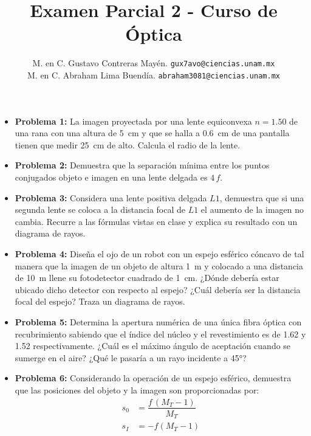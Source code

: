 \documentclass[14pt]{extarticle}
\author{\normalsize{M. en C. Gustavo Contreras Mayén.} \quad \normalsize{\texttt{gux7avo@ciencias.unam.mx}} \\
\normalsize{M. en C. Abraham Lima Buendía.} \quad \normalsize{\texttt{abraham3081@ciencias.unam.mx}}}
\title{\vspace*{-2cm} Examen Parcial 2 - Curso de Óptica}
\date{ }
\begin{document}
\maketitle
\fontsize{14}{14}\selectfont


\begin{itemize}
\item \textbf{Problema 1:} La imagen proyectada por una lente equiconvexa $n = 1.50$ de una rana con una  altura de \SI{5}{\centi\meter} y que se halla a \SI{0.6}{\centi\meter} de una pantalla tienen que medir \SI{25}{\centi\meter} de alto. Calcula el radio de la lente.
\item \textbf{Problema 2:} Demuestra que la separación mínima entre los puntos conjugados objeto e imagen en una lente delgada es $4 \, f$.
\item \textbf{Problema 3:} Considera una lente positiva delgada $L1$, demuestra que si una segunda lente se coloca a la distancia focal de $L1$ el aumento de la imagen no cambia. Recurre a las fórmulas vistas en clase y explica su resultado con un diagrama de rayos.
\item \textbf{Problema 4:} Diseña el ojo de un robot con un espejo esférico cóncavo de tal manera que la imagen de un objeto de altura \SI{1}{\meter} y colocado a una distancia de \SI{10}{\meter} llene su fotodetector cuadrado de \SI{1}{\centi\meter}. ¿Dónde debería estar ubicado dicho detector con respecto al espejo? ¿Cuál debería ser la distancia focal del espejo? Traza un diagrama de rayos.
\item \textbf{Problema 5:} Determina la apertura numérica de una única fibra óptica con recubrimiento sabiendo que el índice del núcleo y el revestimiento es de \num{1.62} y \num{1.52} respectivamente. ¿Cuál es el máximo ángulo de aceptación cuando se sumerge en el aire? ¿Qué le pasaría a un rayo incidente a \ang{45}?

\newpage

\item \textbf{Problema 6:} Considerando la operación de un espejo esférico, demuestra que las posiciones del objeto y la imagen son proporcionadas por:
\begin{align*}
s_{0} &= \dfrac{f \, \left( M_{T} - 1 \right)}{M_{T}} \\[0.5em]
s_{I} &= - f \left(M_{T} - 1 \right)
\end{align*}
\end{itemize}
\end{document}
